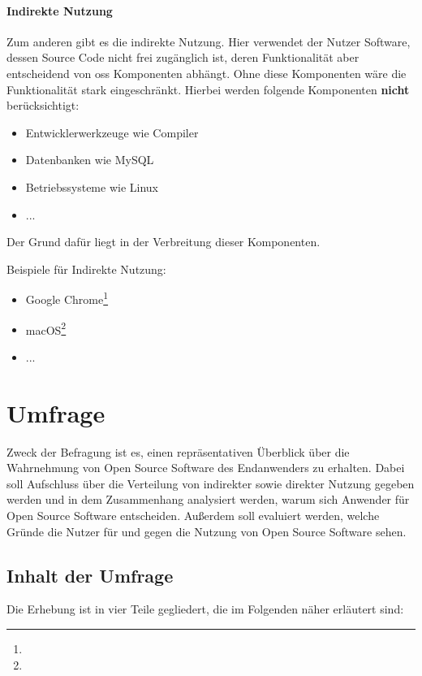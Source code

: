 \documentclass[a4paper]{article}
\begin{document}
            \paragraph{Indirekte Nutzung}
                Zum anderen gibt es die indirekte Nutzung. Hier verwendet der Nutzer Software, dessen Source Code nicht frei zugänglich ist, deren Funktionalität aber entscheidend von \gls{oss} Komponenten abhängt. Ohne diese Komponenten wäre die Funktionalität stark eingeschränkt. Hierbei werden folgende Komponenten \textbf{nicht} berücksichtigt:
                
                \begin{itemize}
                    \item Entwicklerwerkzeuge wie Compiler
                    \item Datenbanken wie MySQL
                    \item Betriebssysteme wie Linux 
                    \item ... %
                \end{itemize}
                Der Grund dafür liegt in der Verbreitung dieser Komponenten. %
                
                Beispiele für Indirekte Nutzung:
                \begin{itemize}
                    \item Google Chrome\footnote{}
                    \item macOS\footnote{}
                    \item ... %
                \end{itemize}
        
    \section{Umfrage}
		Zweck der Befragung ist es, einen repräsentativen Überblick über die Wahrnehmung von Open Source Software des Endanwenders zu erhalten. Dabei soll Aufschluss über die Verteilung von indirekter sowie direkter Nutzung gegeben werden und in dem Zusammenhang analysiert werden, warum sich Anwender für Open Source Software entscheiden. Außerdem soll evaluiert werden, welche Gründe die Nutzer für und gegen die Nutzung von Open Source Software sehen.
	
		\subsection{Inhalt der Umfrage}
			Die Erhebung ist in vier Teile gegliedert, die im Folgenden näher erläutert sind: 
		   
\end{document}
